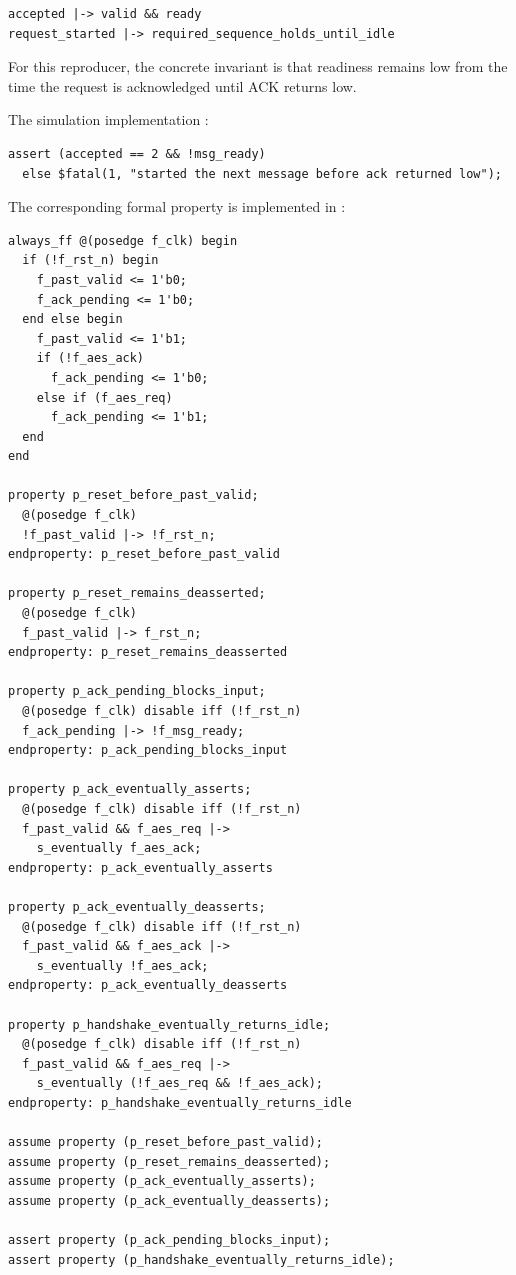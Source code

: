 \documentclass[conference]{IEEEtran}
\begin{document}
\begin{lstlisting}
accepted |-> valid && ready
request_started |-> required_sequence_holds_until_idle
\end{lstlisting}

For this reproducer, the concrete invariant is that readiness remains low from
the time the request is acknowledged until ACK returns low.

The simulation implementation \cite{bug4-simulation-check}:

\begin{lstlisting}
assert (accepted == 2 && !msg_ready)
  else $fatal(1, "started the next message before ack returned low");
\end{lstlisting}

The corresponding formal property is implemented in
\cite{bug4-formal-check}:

\begin{lstlisting}
always_ff @(posedge f_clk) begin
  if (!f_rst_n) begin
    f_past_valid <= 1'b0;
    f_ack_pending <= 1'b0;
  end else begin
    f_past_valid <= 1'b1;
    if (!f_aes_ack)
      f_ack_pending <= 1'b0;
    else if (f_aes_req)
      f_ack_pending <= 1'b1;
  end
end

property p_reset_before_past_valid;
  @(posedge f_clk)
  !f_past_valid |-> !f_rst_n;
endproperty: p_reset_before_past_valid

property p_reset_remains_deasserted;
  @(posedge f_clk)
  f_past_valid |-> f_rst_n;
endproperty: p_reset_remains_deasserted

property p_ack_pending_blocks_input;
  @(posedge f_clk) disable iff (!f_rst_n)
  f_ack_pending |-> !f_msg_ready;
endproperty: p_ack_pending_blocks_input

property p_ack_eventually_asserts;
  @(posedge f_clk) disable iff (!f_rst_n)
  f_past_valid && f_aes_req |->
    s_eventually f_aes_ack;
endproperty: p_ack_eventually_asserts

property p_ack_eventually_deasserts;
  @(posedge f_clk) disable iff (!f_rst_n)
  f_past_valid && f_aes_ack |->
    s_eventually !f_aes_ack;
endproperty: p_ack_eventually_deasserts

property p_handshake_eventually_returns_idle;
  @(posedge f_clk) disable iff (!f_rst_n)
  f_past_valid && f_aes_req |->
    s_eventually (!f_aes_req && !f_aes_ack);
endproperty: p_handshake_eventually_returns_idle

assume property (p_reset_before_past_valid);
assume property (p_reset_remains_deasserted);
assume property (p_ack_eventually_asserts);
assume property (p_ack_eventually_deasserts);

assert property (p_ack_pending_blocks_input);
assert property (p_handshake_eventually_returns_idle);
\end{lstlisting}
\end{document}
